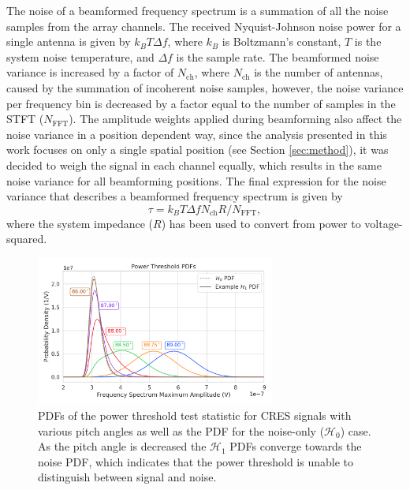 The noise of a beamformed frequency spectrum is a summation of all the noise samples from the array channels. The received Nyquist-Johnson noise power for a single antenna is given by $k_BT\Delta f$, where $k_B$ is Boltzmann's constant, $T$ is the system noise temperature, and $\Delta f$ is the sample rate. The beamformed noise variance is increased by a factor of $N_\textrm{ch}$, where $N_\textrm{ch}$ is the number of antennas, caused by the summation of incoherent noise samples, however, the noise variance per frequency bin is decreased by a factor equal to the number of samples in the STFT ($N_\textrm{FFT}$). The amplitude weights applied during beamforming also affect the noise variance in a position dependent way, since the analysis presented in this work focuses on only a single spatial position (see Section \ref{sec:method}), it was decided to weigh the signal in each channel equally, which results in the same noise variance for all beamforming positions. The final expression for the noise variance that describes a beamformed frequency spectrum is given by 
\begin{equation}
    \tau = k_BT\Delta fN_\textrm{ch}R/N_\textrm{FFT},
    \label{eq:cwgn_var}
\end{equation}
where the system impedance ($R$) has been used to convert from power to voltage-squared. 


\begin{figure}[htbp]
    \centering
    \includegraphics[width=0.7\textwidth]{figs/Chapter-4/230915_fft_power_threshold_pdf_by_pitch.png}
    \caption{PDFs of the power threshold test statistic for CRES signals with various pitch angles as well as the PDF for the noise-only ($\mathcal{H}_0$) case. As the pitch angle is decreased the $\mathcal{H}_1$ PDFs converge towards the noise PDF, which indicates that the power threshold is unable to distinguish between signal and noise. }
    \label{fig:fft_pdf}
\end{figure}

